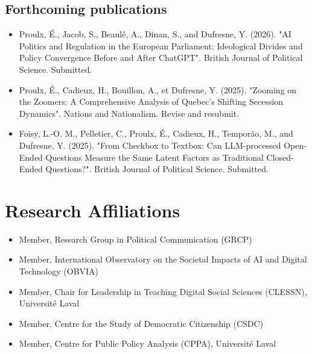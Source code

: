 \documentclass[11pt,letterpaper,sans]{moderncv}        %
\begin{document}
\subsection{\textbf{Forthcoming publications}}
\begin{itemize}
    \item Proulx, É., Jacob, S., Beaulé, A., Dinan, S., and Dufresne, Y. (2026). "AI Politics and Regulation in the European Parliament: Ideological Divides and Policy Convergence Before and After ChatGPT". British Journal of Political Science. Submitted.
    \item Proulx, É., Cadieux, H., Bouillon, A., et Dufresne, Y. (2025). "Zooming on the Zoomers: A Comprehensive Analysis of Quebec's Shifting Secession Dynamics". Nations and Nationalism. Revise and resubmit.
    \item Foisy, L.-O. M., Pelletier, C., Proulx, É., Cadieux, H., Temporão, M., and Dufresne, Y. (2025). "From Checkbox to Textbox: Can LLM-processed Open-Ended Questions Measure the Same Latent Factors as Traditional Closed-Ended Questions?". British Journal of Political Science. Submitted.
\end{itemize}

\section{Research Affiliations}
\begin{itemize}
  \item Member, Research Group in Political Communication (GRCP)
  \item Member, International Observatory on the Societal Impacts of AI and Digital Technology (OBVIA)
  \item Member, Chair for Leadership in Teaching Digital Social Sciences (CLESSN), Université Laval
  \item Member, Centre for the Study of Democratic Citizenship (CSDC)
  \item Member, Centre for Public Policy Analysis (CPPA), Université Laval
\end{itemize}
\end{document}
